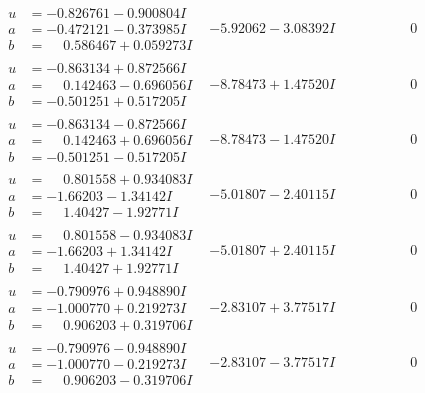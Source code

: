 \documentclass[1p]{elsarticle_modified}
\theoremstyle{definition}
\begin{document}
$$\begin{array}{c|c|c}
\begin{aligned}
u &= -0.826761 - 0.900804 I \\
a &= -0.472121 - 0.373985 I \\
b &= \phantom{-}0.586467 + 0.059273 I\end{aligned}
 & -5.92062 - 3.08392 I & \phantom{-0.000000 } 0 \\ \hline\begin{aligned}
u &= -0.863134 + 0.872566 I \\
a &= \phantom{-}0.142463 - 0.696056 I \\
b &= -0.501251 + 0.517205 I\end{aligned}
 & -8.78473 + 1.47520 I & \phantom{-0.000000 } 0 \\ \hline\begin{aligned}
u &= -0.863134 - 0.872566 I \\
a &= \phantom{-}0.142463 + 0.696056 I \\
b &= -0.501251 - 0.517205 I\end{aligned}
 & -8.78473 - 1.47520 I & \phantom{-0.000000 } 0 \\ \hline\begin{aligned}
u &= \phantom{-}0.801558 + 0.934083 I \\
a &= -1.66203 - 1.34142 I \\
b &= \phantom{-}1.40427 - 1.92771 I\end{aligned}
 & -5.01807 - 2.40115 I & \phantom{-0.000000 } 0 \\ \hline\begin{aligned}
u &= \phantom{-}0.801558 - 0.934083 I \\
a &= -1.66203 + 1.34142 I \\
b &= \phantom{-}1.40427 + 1.92771 I\end{aligned}
 & -5.01807 + 2.40115 I & \phantom{-0.000000 } 0 \\ \hline\begin{aligned}
u &= -0.790976 + 0.948890 I \\
a &= -1.000770 + 0.219273 I \\
b &= \phantom{-}0.906203 + 0.319706 I\end{aligned}
 & -2.83107 + 3.77517 I & \phantom{-0.000000 } 0 \\ \hline\begin{aligned}
u &= -0.790976 - 0.948890 I \\
a &= -1.000770 - 0.219273 I \\
b &= \phantom{-}0.906203 - 0.319706 I\end{aligned}
 & -2.83107 - 3.77517 I & \phantom{-0.000000 } 0\\

\end{array}$$
\end{document}
